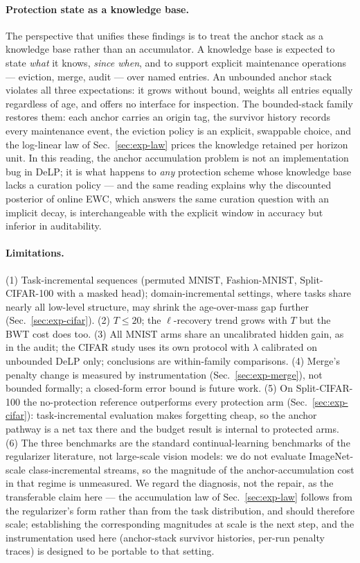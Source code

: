 \documentclass[review,12pt,number]{elsarticle}
\newcommand{\delp}{DeLP}
\begin{document}
\paragraph{Protection state as a knowledge base.}
The perspective that unifies these findings is to treat the anchor
stack as a knowledge base rather than an accumulator. A knowledge base
is expected to state \emph{what} it knows, \emph{since when}, and to
support explicit maintenance operations --- eviction, merge, audit ---
over named entries. An unbounded anchor stack violates all three
expectations: it grows without bound, weights all entries equally
regardless of age, and offers no interface for inspection. The
bounded-stack family restores them: each anchor carries an origin tag,
the survivor history records every maintenance event, the eviction
policy is an explicit, swappable choice, and the log-linear law of
Sec.~\ref{sec:exp-law} prices the knowledge retained per horizon
unit. In this reading, the anchor accumulation problem is not an
implementation bug in \delp{}; it is what happens to \emph{any}
protection scheme whose knowledge base lacks a curation policy ---
and the same reading explains why the discounted posterior of online
EWC, which answers the same curation question with an implicit decay,
is interchangeable with the explicit window in accuracy but inferior
in auditability.

\paragraph{Limitations.}
(1) Task-incremental sequences (permuted MNIST, Fashion-MNIST,
Split-CIFAR-100 with a masked head); domain-incremental settings,
where tasks share nearly all low-level structure, may shrink the
age-over-mass gap further (Sec.~\ref{sec:exp-cifar}). (2) $T \le 20$;
the $\ell$-recovery trend grows with $T$ but the BWT cost does too.
(3) All MNIST arms share an uncalibrated hidden gain, as in the audit;
the CIFAR study uses its own protocol with $\lambda$ calibrated on
unbounded \delp{} only; conclusions are within-family comparisons.
(4) Merge's penalty change is measured by instrumentation
(Sec.~\ref{sec:exp-merge}), not bounded formally; a closed-form error
bound is future work. (5) On Split-CIFAR-100 the no-protection reference
outperforms every protection arm
(Sec.~\ref{sec:exp-cifar}): task-incremental evaluation makes
forgetting cheap, so the anchor pathway is a net tax there and the
budget result is internal to protected arms.
(6) The three benchmarks are the standard continual-learning
benchmarks of the regularizer literature, not large-scale vision
models: we do not evaluate ImageNet-scale class-incremental streams, so
the magnitude of the anchor-accumulation cost in that regime is
unmeasured. We regard the diagnosis, not the repair, as the transferable
claim here --- the accumulation law of Sec.~\ref{sec:exp-law}
follows from the regularizer's form rather than from the task
distribution, and should therefore scale; establishing the
corresponding magnitudes at scale is the next step, and the
instrumentation used here (anchor-stack survivor histories, per-run
penalty traces) is designed to be portable to that setting.
\end{document}
